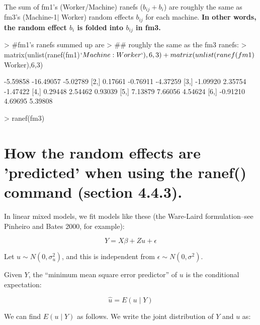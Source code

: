 \documentclass[12pt]{amsart}
\begin{document}
The sum of fm1's (Worker/Machine) ranefs ($b_{ij}+b_i$) are roughly the same as fm3's (Machine-1$\mid$ Worker) random effects $b_{ij}$ for each machine. \textbf{In other words, the random effect $b_i$ is folded into $b_{ij}$ in fm3.}

\begin{Schunk}
\begin{Sinput}
> #fm1's ranefs summed up are 
> ## roughly the same as the fm3 ranefs:
> matrix(unlist(ranef(fm1)$`Machine:Worker`),6,3) +
   matrix(unlist(ranef(fm1)$Worker),6,3)
\end{Sinput}
\begin{Soutput}
         [,1]      [,2]     [,3]
[1,] -5.59858 -16.49057 -5.02789
[2,]  0.17661  -0.76911 -4.37259
[3,] -1.09920   2.35754 -1.47422
[4,]  0.29448   2.54462  0.93039
[5,]  7.13879   7.66056  4.54624
[6,] -0.91210   4.69695  5.39808
\end{Soutput}
\begin{Sinput}
> ranef(fm3)
\end{Sinput}
\end{Schunk}

\section{How the random effects are 'predicted' when using the ranef() command (section 4.4.3).}

In linear mixed models, we fit models like these (the Ware-Laird formulation--see Pinheiro and Bates 2000, for example):

\begin{equation} 
Y = X\beta + Zu + \epsilon
\end{equation}

Let $u\sim N(0,\sigma_u^2)$, and this is independent from $\epsilon\sim N(0,\sigma^2)$.  

Given $Y$, the ``minimum mean square error predictor'' of $u$ is the conditional expectation:

\begin{equation}
\hat{u} = E(u\mid Y)
\end{equation}

We can find $E(u\mid Y)$ as follows. We write the joint distribution of $Y$ and $u$ as:
\end{document}
